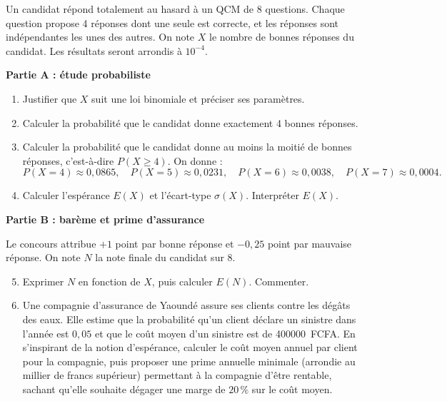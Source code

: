 \documentclass[11pt]{article}
\begin{document}
\begin{exercice}
Un candidat répond totalement au hasard à un QCM de 8 questions. Chaque question propose 4 réponses dont une seule est correcte, et les réponses sont indépendantes les unes des autres. On note $X$ le nombre de bonnes réponses du candidat. Les résultats seront arrondis à $10^{-4}$.

\textbf{Partie A : étude probabiliste}
\begin{enumerate}
\item Justifier que $X$ suit une loi binomiale et préciser ses paramètres.
\item Calculer la probabilité que le candidat donne exactement 4 bonnes réponses.
\item Calculer la probabilité que le candidat donne au moins la moitié de bonnes réponses, c'est-à-dire $P(X\ge 4)$. On donne :
\[
P(X=4)\approx 0{,}0865,\quad P(X=5)\approx 0{,}0231,\quad P(X=6)\approx 0{,}0038,\quad P(X=7)\approx 0{,}0004.
\]
\item Calculer l'espérance $E(X)$ et l'écart-type $\sigma(X)$. Interpréter $E(X)$.
\end{enumerate}

\textbf{Partie B : barème et prime d'assurance}

Le concours attribue $+1$ point par bonne réponse et $-0{,}25$ point par mauvaise réponse. On note $N$ la note finale du candidat sur 8.
\begin{enumerate}
\setcounter{enumi}{4}
\item Exprimer $N$ en fonction de $X$, puis calculer $E(N)$. Commenter.
\item Une compagnie d'assurance de Yaoundé assure ses clients contre les dégâts des eaux. Elle estime que la probabilité qu'un client déclare un sinistre dans l'année est $0{,}05$ et que le coût moyen d'un sinistre est de \SI{400000}{FCFA}. En s'inspirant de la notion d'espérance, calculer le coût moyen annuel par client pour la compagnie, puis proposer une prime annuelle minimale (arrondie au millier de francs supérieur) permettant à la compagnie d'être rentable, sachant qu'elle souhaite dégager une marge de $20\,\%$ sur le coût moyen.
\end{enumerate}
\end{exercice}
\end{document}
